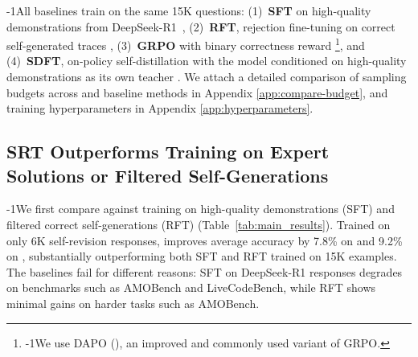 \looseness-1All baselines train on the same 15K questions: (1)~\textbf{SFT} on high-quality demonstrations from DeepSeek-R1~\citep{Guo_2025}, (2)~\textbf{RFT}, rejection fine-tuning on correct self-generated traces \citep{yuan2023scalingrelationshiplearningmathematical}, (3)~\textbf{GRPO} with binary correctness reward \citep{grpo} \footnote{\looseness-1We use DAPO (\citet{yu2025dapo}), an improved and commonly used variant of GRPO.}, and (4)~\textbf{SDFT}, on-policy self-distillation with the model conditioned on high-quality demonstrations as its own teacher \citep{zhao2026selfdistilledreasoneronpolicyselfdistillation, shenfeld2026selfdistillationenablescontinuallearning}. 
We attach a detailed comparison of sampling budgets across \ours{} and baseline methods in Appendix \ref{app:compare-budget}, and training hyperparameters in Appendix \ref{app:hyperparameters}.

 
\subsection{SRT Outperforms Training on Expert Solutions or Filtered Self-Generations}
\label{sec:srt-results}


\looseness-1We first compare \sft{} against training on high-quality demonstrations (SFT) and filtered correct self-generations (RFT) (Table~\ref{tab:main_results}). Trained on only 6K self-revision responses, \sft{} improves average accuracy by 7.8\% on \qwen{} and 9.2\% on \olmo{}, substantially outperforming both SFT and RFT trained on 15K examples. The baselines fail for different reasons: SFT on DeepSeek-R1 responses degrades \qwen{} on benchmarks such as AMOBench and LiveCodeBench, while RFT shows minimal gains on harder tasks such as AMOBench.

